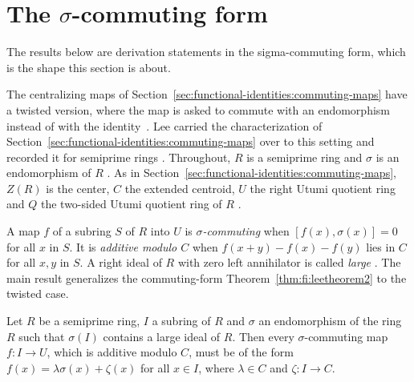 \section{The $\sigma$-commuting form}\label{sec:functional-identities:centralizers-multipliers}

The results below are derivation statements in the sigma-commuting form, which
is the shape this section is about.

The centralizing maps of
Section~\ref{sec:functional-identities:commuting-maps} have a twisted
version, where the map is asked to commute with an endomorphism instead of
with the identity~\cite[p.~2946]{LeeTK2001SigmaCommuting}. Lee carried the characterization of
Section~\ref{sec:functional-identities:commuting-maps} over to this
setting and recorded it for semiprime rings
\cite[p.~2946]{LeeTK2001SigmaCommuting}. Throughout, $R$ is a semiprime
ring and $\sigma$ is an endomorphism of $R$
\cite[p.~2946]{LeeTK2001SigmaCommuting}. As in
Section~\ref{sec:functional-identities:commuting-maps}, $Z(R)$ is the
center, $C$ the extended centroid, $U$ the right Utumi quotient ring and
$Q$ the two-sided Utumi quotient ring of $R$
\cite[p.~2946]{LeeTK2001SigmaCommuting}.

A map $f$ of a subring $S$ of $R$ into $U$ is \emph{$\sigma$-commuting}
\cite[p.~2946]{LeeTK2001SigmaCommuting} when $[f(x),\sigma(x)]=0$ for all
$x$ in $S$. It is \emph{additive modulo $C$}
\cite[p.~2946]{LeeTK2001SigmaCommuting} when $f(x+y)-f(x)-f(y)$ lies in
$C$ for all $x,y$ in $S$. A right ideal of $R$ with zero left annihilator
is called \emph{large} \cite[p.~2946]{LeeTK2001SigmaCommuting}. The main
result generalizes the commuting-form Theorem~\ref{thm:fi:leetheorem2} to
the twisted case.

\begin{theorem}\label{thm:fi:leesigmamain}
Let $R$ be a semiprime ring, $I$ a subring of $R$ and $\sigma$ an
endomorphism of the ring $R$ such that $\sigma(I)$ contains a large ideal
of $R$. Then every $\sigma$-commuting map $f\colon I\to U$, which is
additive modulo $C$, must be of the form $f(x)=\lambda\sigma(x)+\zeta(x)$
for all $x\in I$, where $\lambda\in C$ and $\zeta\colon I\to C$.
\end{theorem}

